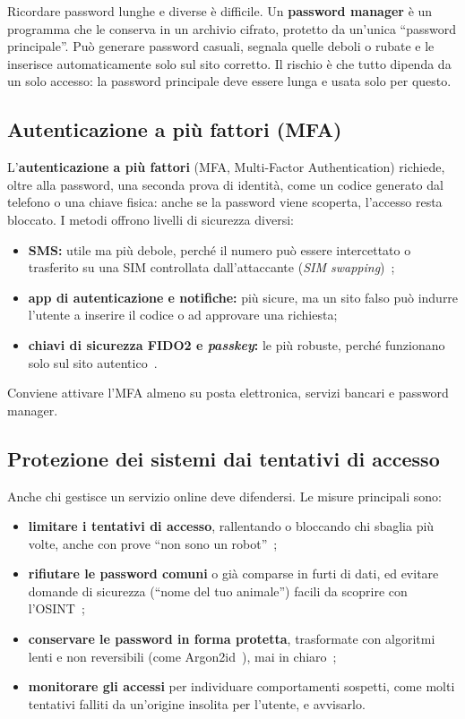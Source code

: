 Ricordare password lunghe e diverse è difficile. Un \textbf{password manager} è un programma che le conserva in un archivio cifrato, protetto da un'unica ``password principale''. Può generare password casuali, segnala quelle deboli o rubate e le inserisce automaticamente solo sul sito corretto. Il rischio è che tutto dipenda da un solo accesso: la password principale deve essere lunga e usata solo per questo.
 
\subsection{Autenticazione a più fattori (MFA)}\label{sec:mfa}
 
L'\textbf{autenticazione a più fattori} (MFA, Multi-Factor Authentication) richiede, oltre alla password, una seconda prova di identità, come un codice generato dal telefono o una chiave fisica: anche se la password viene scoperta, l'accesso resta bloccato. I metodi offrono livelli di sicurezza diversi:
 
\begin{itemize}
    \item \textbf{SMS:} utile ma più debole, perché il numero può essere intercettato o trasferito su una SIM controllata dall'attaccante (\emph{SIM swapping})~\cite{enisa2021sim};
    \item \textbf{app di autenticazione e notifiche:} più sicure, ma un sito falso può indurre l'utente a inserire il codice o ad approvare una richiesta;
    \item \textbf{chiavi di sicurezza FIDO2 e \emph{passkey}:} le più robuste, perché funzionano solo sul sito autentico~\cite{webauthn}.
\end{itemize}
 
Conviene attivare l'MFA almeno su posta elettronica, servizi bancari e password manager.
 
\subsection{Protezione dei sistemi dai tentativi di accesso}\label{sec:difese-sistema}
 
Anche chi gestisce un servizio online deve difendersi. Le misure principali sono:
 
\begin{itemize}
    \item \textbf{limitare i tentativi di accesso}, rallentando o bloccando chi sbaglia più volte, anche con prove ``non sono un robot''~\cite{nist80063b};
    \item \textbf{rifiutare le password comuni} o già comparse in furti di dati, ed evitare domande di sicurezza (``nome del tuo animale'') facili da scoprire con l'OSINT~\cite{nist80063b};
    \item \textbf{conservare le password in forma protetta}, trasformate con algoritmi lenti e non reversibili (come Argon2id~\cite{rfc9106}), mai in chiaro~\cite{owaspcheatsheet};
    \item \textbf{monitorare gli accessi} per individuare comportamenti sospetti, come molti tentativi falliti da un'origine insolita per l'utente, e avvisarlo.
\end{itemize}
 
